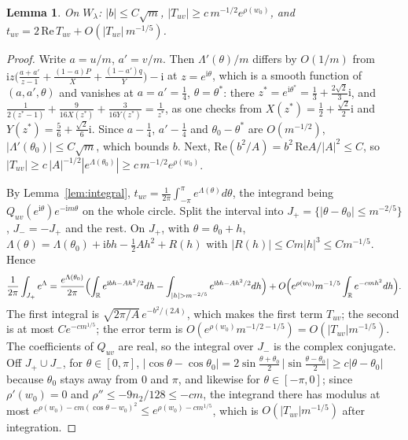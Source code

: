 \documentclass[11pt]{amsart}
\newtheorem{lemma}[theorem]{Lemma}
\theoremstyle{remark}
\newcommand{\ii}{\mathrm{i}}
\begin{document}
\begin{lemma}\label{lem:laplace}
On $W_\lambda$: $|b|\le C\sqrt m$, $|T_{uv}|\ge c\,m^{-1/2}e^{\rho(w_0)}$, and
$t_{uv}=2\,\mathrm{Re}\,T_{uv}+O(|T_{uv}|\,m^{-1/5})$.
\end{lemma}

\begin{proof}
Write $a=u/m$, $a'=v/m$. Then $\Lambda'(\theta)/m$ differs by $O(1/m)$ from
$\ii z\bigl(\frac{a+a'}{z-1}+\frac{(1-a)P}{X}+\frac{(1-a')q}{Y}\bigr)-\ii$ at $z=e^{\ii\theta}$, which is a smooth
function of $(a,a',\theta)$ and vanishes at $a=a'=\frac14$, $\theta=\theta^*$: there $z^*=e^{\ii\theta^*}=\frac13+\frac{2\sqrt2}3\ii$, and
$\frac{1}{2(z^*-1)}+\frac{9}{16X(z^*)}+\frac{3}{16Y(z^*)}=\frac1{z^*}$, as one checks from $X(z^*)=\frac12+\frac{\sqrt2}2\ii$
and $Y(z^*)=\frac56+\frac{\sqrt2}6\ii$. Since $a-\frac14$, $a'-\frac14$ and $\theta_0-\theta^*$ are $O(m^{-1/2})$,
$|\Lambda'(\theta_0)|\le C\sqrt m$, which bounds $b$. Next, $\mathrm{Re}(b^2/A)=b^2\,\mathrm{Re}A/|A|^2\le C$, so
$|T_{uv}|\ge c\,|A|^{-1/2}|e^{\Lambda(\theta_0)}|\ge c\,m^{-1/2}e^{\rho(w_0)}$.

By Lemma~\ref{lem:integral}, $t_{uv}=\frac1{2\pi}\int_{-\pi}^\pi e^{\Lambda(\theta)}d\theta$, the integrand being
$Q_{uv}(e^{\ii\theta})e^{-\ii m\theta}$ on the whole circle. Split the interval into $J_+=\{|\theta-\theta_0|\le
m^{-2/5}\}$, $J_-=-J_+$ and the rest. On $J_+$, with $\theta=\theta_0+h$,
$\Lambda(\theta)=\Lambda(\theta_0)+\ii bh-\frac12Ah^2+R(h)$ with $|R(h)|\le Cm|h|^3\le Cm^{-1/5}$. Hence
\[
\frac1{2\pi}\int_{J_+}e^{\Lambda}=\frac{e^{\Lambda(\theta_0)}}{2\pi}\Bigl(\int_{\mathbb R}e^{\ii bh-Ah^2/2}dh
-\int_{|h|>m^{-2/5}}e^{\ii bh-Ah^2/2}dh\Bigr)+O\Bigl(e^{\rho(w_0)}m^{-1/5}\int_{\mathbb R}e^{-cmh^2}dh\Bigr).
\]
The first integral is $\sqrt{2\pi/A}\,e^{-b^2/(2A)}$, which makes the first term $T_{uv}$; the second is at most
$Ce^{-cm^{1/5}}$; the error term is $O(e^{\rho(w_0)}m^{-1/2-1/5})=O(|T_{uv}|m^{-1/5})$. The coefficients of $Q_{uv}$
are real, so the integral over $J_-$ is the complex conjugate. Off $J_+\cup J_-$, for $\theta\in[0,\pi]$,
$|\cos\theta-\cos\theta_0|=2\sin\frac{\theta+\theta_0}2\,\bigl|\sin\frac{\theta-\theta_0}2\bigr|\ge c|\theta-\theta_0|$
because $\theta_0$ stays away from $0$ and $\pi$, and likewise for $\theta\in[-\pi,0]$; since $\rho'(w_0)=0$ and
$\rho''\le-9n_2/128\le-cm$, the integrand there has modulus at most
$e^{\rho(w_0)-cm(\cos\theta-w_0)^2}\le e^{\rho(w_0)-cm^{1/5}}$, which is $O(|T_{uv}|m^{-1/5})$ after integration.
\end{proof}
\end{document}
